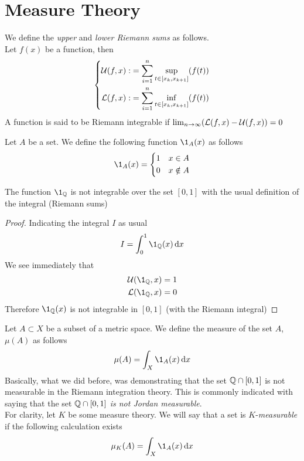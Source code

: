 \documentclass[../complete.tex]{subfiles}
\begin{document}
\section{Measure Theory}
\begin{dfn}
	We define the \textit{upper} and \textit{lower Riemann sums} as follows.\\
	Let $f(x)$ be a function, then
	\begin{equation}
		\left\{\begin{aligned}
				\operatorname{\mathcal{U}}(f,x):&=\sum_{i=1}^n\sup_{t\in[x_k,x_{k+1}]}(f(t))\\
				\operatorname{\mathcal{L}}(f,x):&=\sum_{i=1}^n\inf_{t\in[x_k,x_{k+1}]}(f(t))
		\end{aligned}\right.
		\label{eq:upperlowersums}
	\end{equation}
	A function is said to be Riemann integrable if $\lim_{n\to\infty}(\operatorname{\mathcal{L}}(f,x)-\operatorname{\mathcal{U}}(f,x))=0$
\end{dfn}
\begin{dfn}
	Let $A$ be a set. We define the following function $\1_A(x)$ as follows
	\begin{equation}
		\1_A(x)=\begin{dcases}1&x\in A\\0&x\notin A\end{dcases}
		\label{eq:setfunc}
	\end{equation}
\end{dfn}
\begin{thm}
	The function $\1_\Q$ is not integrable over the set $[0,1]$ with the usual definition of the integral (Riemann sums)
\end{thm}
\begin{proof}
	Indicating the integral $I$ as usual
	\begin{equation*}
		I=\int_{0}^{1}\1_\Q(x)\diff x
	\end{equation*}
	We see immediately that
	\begin{equation*}
		\begin{aligned}
			\Us(\1_\Q,x)&=1\\
			\Ls(\1_\Q,x)&=0
		\end{aligned}
	\end{equation*}
	Therefore $\1_\Q(x)$ is not integrable in $[0,1]$ (with the Riemann integral)
\end{proof}
\begin{dfn}[Measure]
	Let $A\subset X$ be a subset of a metric space. We define the measure of the set $A$, $\mu(A)$ as follows
	\begin{equation}
		\mu(A)=\int_{X}^{}\1_A(x)\diff x
		\label{eq:measureset}
	\end{equation}
	Basically, what we did before, was demonstrating that the set $\mathbb{Q}\cap[0,1]$ is not measurable in the Riemann integration theory. This is commonly indicated with saying that the set $\mathbb{Q}\cap[0,1]$ \textit{is not Jordan measurable}.\\
	For clarity, let $K$ be some measure theory. We will say that a set is $K$-\textit{measurable} if the following calculation exists
	\begin{equation}
		\mu_K(A)=\int_{X}^{}\1_A(x)\diff x
		\label{eq:kmeasureset}
	\end{equation}
\end{dfn}
\end{document}
